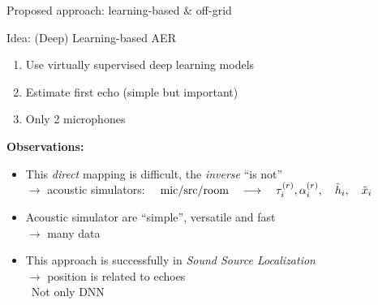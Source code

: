\begin{frame}{Proposed approach: learning-based \& off-grid \hfill\faBrain}

    \begin{mydefblock}{Idea: (Deep) Learning-based AER}
        \begin{enumerate}
            \item Use \alert{virtually} supervised deep learning models
            \item Estimate first echo (simple but important)
            \item Only 2 microphones
        \end{enumerate}
    \end{mydefblock}

    \vfill
    \textbf{Observations:}
    \begin{itemize}
        \item This \textit{direct} mapping is difficult, the \textit{inverse} ``is not''
        \\$\rightarrow$ acoustic simulators:
            $\quad \text{mic/src/room}
            \quad \longrightarrow \quad
            \tau_i^{(r)},\alpha_i^{(r)}, \quad \tilde{h}_i, \quad \tilde{x}_i$
        \item Acoustic simulator are ``simple'', versatile and fast
        \\$\to$ many data
        \item This approach is successfully in \textit{Sound Source Localization}
        \\$\to$ position is related to echoes
        \\{\small\cite{nguyen2018autonomous,perotin2019regression} \textcolor{myred}{\faExclamationTriangle~Not only DNN}}
    \end{itemize}



\end{frame}

